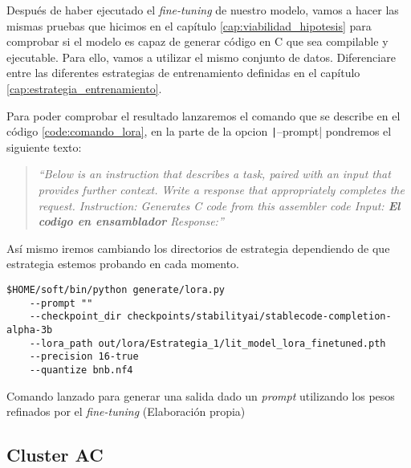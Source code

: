 
Después de haber ejecutado el \textit{fine-tuning} de nuestro modelo, vamos a hacer las mismas pruebas
que hicimos en el capítulo \ref{cap:viabilidad_hipotesis} para comprobar si el modelo es capaz de
generar código en C que sea compilable y ejecutable. Para ello, vamos a utilizar el mismo conjunto
de datos. Diferenciare entre las diferentes estrategias de entrenamiento definidas en el capítulo
\ref{cap:estrategia_entrenamiento}.

Para poder comprobar el resultado lanzaremos el comando que se describe en el código \ref{code:comando_lora},
en la parte de la opcion \texttt|--prompt| pondremos el siguiente texto:

\begin{quote}
    \textit{``Below is an instruction that describes a task, paired with an input that provides further context.
    Write a response that appropriately completes the request. \newline
    Instruction: Generates C code from this assembler code \newline
    Input: \textbf{El codigo en ensamblador}\newline
    Response:''}
\end{quote}

Así mismo iremos cambiando los directorios de estrategia dependiendo de que estrategia estemos probando
en cada momento.

\begin{mycode}
    \begin{verbatim}
$HOME/soft/bin/python generate/lora.py 
    --prompt "" 
    --checkpoint_dir checkpoints/stabilityai/stablecode-completion-alpha-3b 
    --lora_path out/lora/Estrategia_1/lit_model_lora_finetuned.pth 
    --precision 16-true
    --quantize bnb.nf4

    \end{verbatim}
    \caption[Comando lanzado para generar una salida dado un \textit{prompt} utilizando los pesos refinados por el \textit{fine-tuning}]{Comando lanzado para generar una salida dado un \textit{prompt} utilizando los pesos refinados por el \textit{fine-tuning} (Elaboración propia)}
    \label{code:comando_lora}
\end{mycode}

\subsection{Cluster AC}
\label{subsec:cluster_ac}

